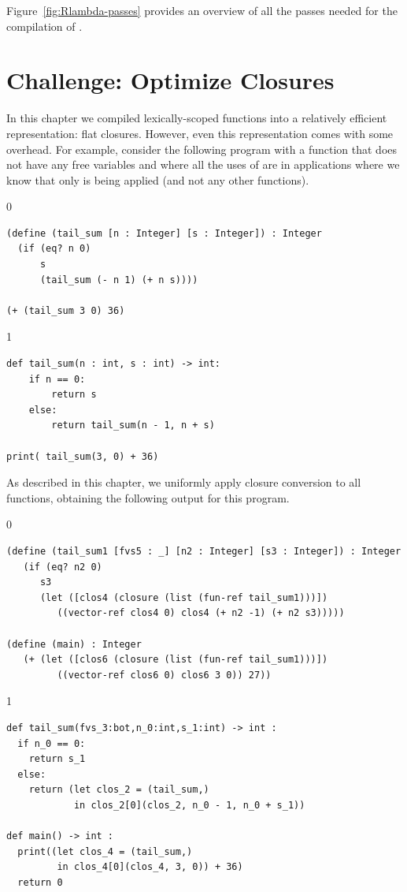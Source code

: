 \documentclass[7x10,nocrop]{TimesAPriori_MIT}%
\def\racketEd{0}
\def\pythonEd{1}
\def\edition{1}
\begin{document}
Figure~\ref{fig:Rlambda-passes} provides an overview of all the passes needed
for the compilation of \LangLam{}.

\clearpage

\section{Challenge: Optimize Closures}
\label{sec:optimize-closures}

In this chapter we compiled lexically-scoped functions into a
relatively efficient representation: flat closures. However, even this
representation comes with some overhead. For example, consider the
following program with a function  that does not have
any free variables and where all the uses of  are in
applications where we know that only  is being applied
(and not any other functions).
\begin{center}
\begin{minipage}{0.95\textwidth}
{\if\edition\racketEd  
\begin{lstlisting}
(define (tail_sum [n : Integer] [s : Integer]) : Integer
  (if (eq? n 0)
      s
      (tail_sum (- n 1) (+ n s))))

(+ (tail_sum 3 0) 36)
\end{lstlisting}
\fi}
{\if\edition\pythonEd
\begin{lstlisting}
def tail_sum(n : int, s : int) -> int:
    if n == 0:
        return s
    else:
        return tail_sum(n - 1, n + s)

print( tail_sum(3, 0) + 36)
\end{lstlisting}
\fi}
\end{minipage}
\end{center}
As described in this chapter, we uniformly apply closure conversion to
all functions, obtaining the following output for this program.
\begin{center}
\begin{minipage}{0.95\textwidth}
{\if\edition\racketEd  
\begin{lstlisting}
(define (tail_sum1 [fvs5 : _] [n2 : Integer] [s3 : Integer]) : Integer
   (if (eq? n2 0)
      s3
      (let ([clos4 (closure (list (fun-ref tail_sum1)))])
         ((vector-ref clos4 0) clos4 (+ n2 -1) (+ n2 s3)))))

(define (main) : Integer
   (+ (let ([clos6 (closure (list (fun-ref tail_sum1)))])
         ((vector-ref clos6 0) clos6 3 0)) 27))
\end{lstlisting}
\fi}
{\if\edition\pythonEd
\begin{lstlisting}
def tail_sum(fvs_3:bot,n_0:int,s_1:int) -> int :
  if n_0 == 0:
    return s_1
  else:
    return (let clos_2 = (tail_sum,)
            in clos_2[0](clos_2, n_0 - 1, n_0 + s_1))

def main() -> int :
  print((let clos_4 = (tail_sum,)
         in clos_4[0](clos_4, 3, 0)) + 36)
  return 0
\end{lstlisting}
\fi}
\end{minipage}
\end{center}
\end{document}
